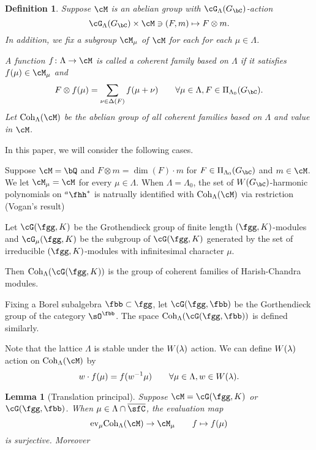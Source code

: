 \documentclass[12pt,a4paper]{amsart}
\numberwithin{equation}{section}
\newtheorem{lem}[thm]{Lemma}
\newtheorem{defn}[thm]{Definition}
\theoremstyle{remark}
\begin{document}
\begin{defn}
Suppose $\cM$ is an abelian group with $\Glfin$-action 
\[
  \Glfin\times \cM \ni(F,m)\mapsto F\otimes m.
\]
In addition,  we fix a subgroup $\cM_\mu$ of $\cM$ for each
 for each  $\mu\in \Lambda$.  

A function $f\colon \Lambda \rightarrow \cM$ is called
  a coherent family based on $\Lambda$ if it satisfies 
  $f(\mu)\in \cM_\mu$ and 
  \[
  F\otimes f(\mu)  = \sum_{\nu \in \WT{F}} f(\mu+\nu) \qquad \forall \mu\in \Lambda, F\in \PiGlfin.
  \] 
Let $\Cohlm$ be the abelian group of all coherent families based on $\Lambda$ and value in $\cM$.   
\end{defn}

In this paper, we will consider the following cases. 

Suppose $\cM = \bQ$ and $F\otimes m = \dim(F)\cdot m$ for $F\in \PiGlfin$ and $m\in \cM$.  
We let $\cM_\mu = \cM$ for every $\mu\in \Lambda$.  
When $\Lambda = \Lambda_0$, the set of $\WG$-harmonic polynomials on $\hha^*$ is natrually 
identified with $\Cohlm$ via restriction (Vogan's result) 

Let $\cG(\fgg,K)$ be the Grothendieck group of finite length $(\fgg,K)$-modules
and $\cG_\mu(\fgg,K)$ be the subgroup of $\cG(\fgg,K)$ generated by the 
set of irreducible $(\fgg,K)$-modules with infinitesimal character $\mu$. 

Then $\Coh_\Lambda(\cG(\fgg,K))$ is the group of coherent families of Harish-Chandra modules. 

Fixing a Borel subalgebra $\fbb\subset \fgg$, let $\cG(\fgg,\fbb)$ be 
the Gorthendieck group of the category $\sO^\fbb$. 
The space $\Coh_\Lambda(\cG(\fgg,\fbb))$ is defined similarly. 

Note that the lattice $\Lambda$ is stable under the $W(\lambda)$ action. 
We can define $W(\lambda)$ action on $\Coh_\Lambda(\cM)$ by  
\[
   w\cdot f(\mu) =  f(w^{-1} \mu) \qquad \forall \mu\in \Lambda, w\in W(\lambda).
\]


\begin{lem}[Translation principal]
  Suppose $\cM = \cG(\fgg,K)$ or $\cG(\fgg,\fbb)$.
  When $\mu\in \Lambda\cap \bCon$, the evaluation map 
  \[
    \ev{\mu} \Coh_\Lambda(\cM)\rightarrow \cM_\mu \qquad f\mapsto f(\mu)    
  \] 
  is surjective. Moreover 
\end{lem}
\end{document}
